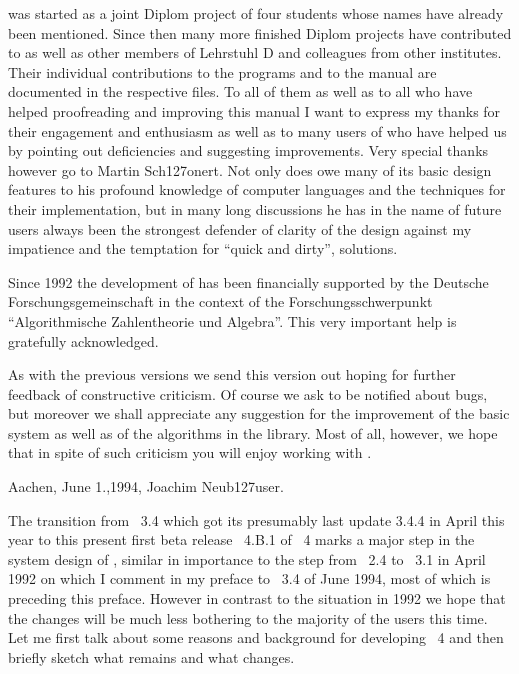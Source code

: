 {\GAP} was started as a joint Diplom project of four students whose names
have  already  been  mentioned.   Since then many   more finished  Diplom
projects have contributed to {\GAP} as well as other members of Lehrstuhl
D  and colleagues from other  institutes.  Their individual contributions
to the programs and to the manual are documented in the respective files.
To all of   them as well    as to all who  have   helped proofreading and
improving this manual  I want to express  my thanks for their  engagement
and enthusiasm as well as to many users  of {\GAP} who  have helped us by
pointing out   deficiencies and  suggesting improvements.   Very  special
thanks however go to  Martin Sch\accent127onert.  Not only  does {\GAP}
owe many  of  its  basic design  features  to his  profound  knowledge of
computer languages  and the techniques for  their  implementation, but in
many long discussions he has in the name of  future users always been the
strongest defender of clarity of the design against my impatience and the
temptation for ``quick and dirty'', solutions.

Since  1992 the development of  {\GAP}  has been financially supported by
the Deutsche     Forschungsgemeinschaft    in  the   context      of  the
Forschungsschwerpunkt  ``Algorithmische Zahlentheorie   und  Algebra''.
This very important help is gratefully acknowledged.

As with the previous versions we send this version out hoping for further
feedback of constructive   criticism.  Of course  we ask  to be  notified
about bugs,  but moreover  we shall  appreciate   any suggestion  for the
improvement of the  basic  system as  well  as of  the algorithms  in the
library.  Most of all,  however, we hope that in  spite of such criticism
you will enjoy working with {\GAP}.

Aachen, June 1.,1994, \hfill Joachim Neub\accent127user.


The transition from {\GAP}~3.4 which got its presumably last update 3.4.4
in April  this year to this  present first beta  release {\GAP}~4.B.1  of
{\GAP}~4  marks a  major step in the system  design of {\GAP}, similar in
importance to the  step from {\GAP}~2.4 to   {\GAP}~3.1 in April 1992  on
which I comment in my preface  to {\GAP}~3.4 of  June 1994, most of which
is preceding this  preface. However in  contrast to the situation in 1992
we hope that the  changes will be much less  bothering to the majority of
the  {\GAP} users this time.   Let me first talk   about some reasons and
background  for developing {\GAP}~4  and then briefly sketch what remains
and what changes.

